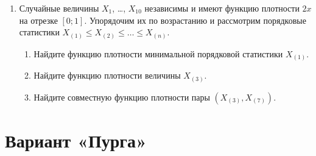 \documentclass[12pt]{article}
\begin{document}
\begin{enumerate}
    \item Случайные величины $X_1$, \dots, $X_{10}$ независимы и имеют функцию плотности $2x$ на отрезке $[0;1]$.
    Упорядочим их по возрастанию и рассмотрим порядковые статистики $X_{(1)} \leq X_{(2)} \leq \dots \leq X_{(n)}$.
    \begin{enumerate}
        \item Найдите функцию плотности минимальной порядковой статистики $X_{(1)}$.
        \item Найдите функцию плотности величины $X_{(3)}$.
        \item Найдите совместную функцию плотности пары $(X_{(3)}, X_{(7)})$.
    \end{enumerate}
\end{enumerate}


\section*{Вариант «Пурга»}
\end{document}
